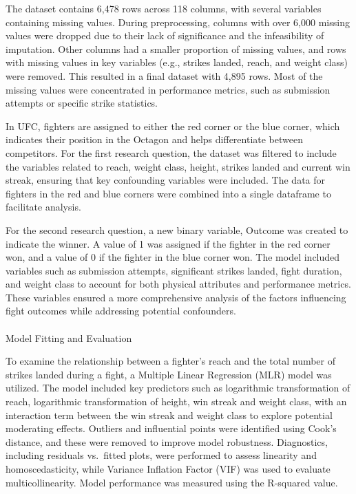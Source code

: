 \documentclass[
  letterpaper,
  DIV=11,
  numbers=noendperiod]{scrartcl}
\makeatletter
\let\oldparagraph\paragraph
\renewcommand{\paragraph}{
    \@ifstar
      \xxxParagraphStar
      \xxxParagraphNoStar
  }
\newcommand{\xxxParagraphStar}[1]{\oldparagraph*{#1}\mbox{}}
\newcommand{\xxxParagraphNoStar}[1]{\oldparagraph{#1}\mbox{}}
\makeatother
\begin{document}
The dataset contains 6,478 rows across 118 columns, with several
variables containing missing values. During preprocessing, columns with
over 6,000 missing values were dropped due to their lack of significance
and the infeasibility of imputation. Other columns had a smaller
proportion of missing values, and rows with missing values in key
variables (e.g., strikes landed, reach, and weight class) were removed.
This resulted in a final dataset with 4,895 rows. Most of the missing
values were concentrated in performance metrics, such as submission
attempts or specific strike statistics.

In UFC, fighters are assigned to either the red corner or the blue
corner, which indicates their position in the Octagon and helps
differentiate between competitors. For the first research question, the
dataset was filtered to include the variables related to reach, weight
class, height, strikes landed and current win streak, ensuring that key
confounding variables were included. The data for fighters in the red
and blue corners were combined into a single dataframe to facilitate
analysis.

For the second research question, a new binary variable, Outcome was
created to indicate the winner. A value of 1 was assigned if the fighter
in the red corner won, and a value of 0 if the fighter in the blue
corner won. The model included variables such as submission attempts,
significant strikes landed, fight duration, and weight class to account
for both physical attributes and performance metrics. These variables
ensured a more comprehensive analysis of the factors influencing fight
outcomes while addressing potential confounders.

\paragraph{Model Fitting and
Evaluation}\label{model-fitting-and-evaluation}

To examine the relationship between a fighter's reach and the total
number of strikes landed during a fight, a Multiple Linear Regression
(MLR) model was utilized. The model included key predictors such as
logarithmic transformation of reach, logarithmic transformation of
height, win streak and weight class, with an interaction term between
the win streak and weight class to explore potential moderating effects.
Outliers and influential points were identified using Cook's distance,
and these were removed to improve model robustness. Diagnostics,
including residuals vs.~fitted plots, were performed to assess linearity
and homoscedasticity, while Variance Inflation Factor (VIF) was used to
evaluate multicollinearity. Model performance was measured using the
R-squared value.
\end{document}
